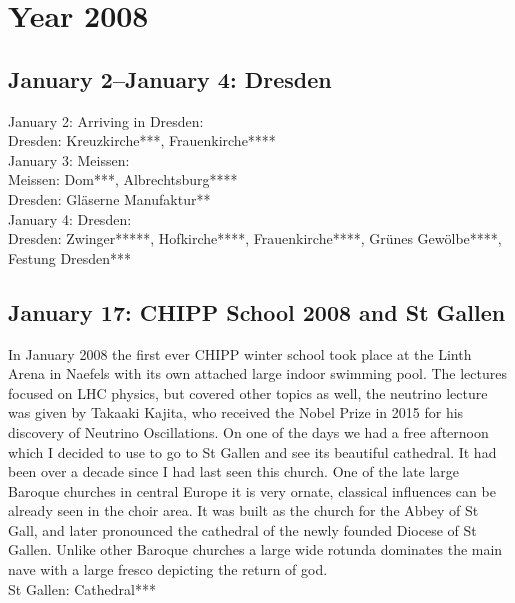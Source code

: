 \chapter{Year 2008}
\label{2008}

\section{January 2--January 4: Dresden}
\label{2008:Dresden}

January 2: Arriving in Dresden:\\

Dresden: Kreuzkirche***, Frauenkirche****\\

January 3: Meissen:\\

Meissen: Dom***, Albrechtsburg****\\
Dresden: Gl\"aserne Manufaktur**\\

January 4: Dresden:\\

Dresden: Zwinger*****, Hofkirche****, Frauenkirche****, Gr\"unes Gew\"olbe****, Festung Dresden***

\section{January 17: CHIPP School 2008 and St Gallen}
\label{2008:StGallen}

In January 2008 the first ever CHIPP winter school took place at the Linth Arena in Naefels with its own attached large indoor swimming pool. The lectures focused on LHC physics, but covered other topics as well, the neutrino lecture was given by Takaaki Kajita, who received the Nobel Prize in 2015 for his discovery of Neutrino Oscillations. On one of the days we had a free afternoon which I decided to use to go to St Gallen and see its beautiful cathedral. It had been over a decade since I had last seen this church. One of the late large Baroque churches in central Europe it is very ornate, classical influences can be already seen in the choir area. It was built as the church for the Abbey of St Gall, and later pronounced the cathedral of the newly founded Diocese of St Gallen. Unlike other Baroque churches a large wide rotunda dominates the main nave with a large fresco depicting the return of god.\\

St Gallen: Cathedral***\\

